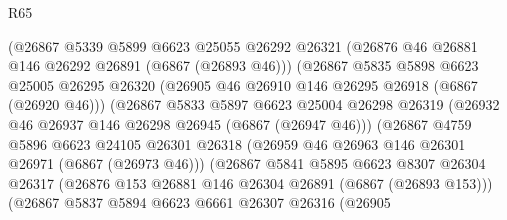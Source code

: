 \begin{lexlean}{R65}
\begin{coremodule}
{                              (@26867
                                @5339
                                @5899
                                @6623
                                @25055
                                @26292
                                @26321
                                (@26876 @46 @26881 @146 @26292 @26891 (@6867 (@26893 @46)))
                                (@26867
                                  @5835
                                  @5898
                                  @6623
                                  @25005
                                  @26295
                                  @26320
                                  (@26905 @46 @26910 @146 @26295 @26918 (@6867 (@26920 @46)))
                                  (@26867
                                    @5833
                                    @5897
                                    @6623
                                    @25004
                                    @26298
                                    @26319
                                    (@26932 @46 @26937 @146 @26298 @26945 (@6867 (@26947 @46)))
                                    (@26867
                                      @4759
                                      @5896
                                      @6623
                                      @24105
                                      @26301
                                      @26318
                                      (@26959 @46 @26963 @146 @26301 @26971 (@6867 (@26973 @46)))
                                      (@26867
                                        @5841
                                        @5895
                                        @6623
                                        @8307
                                        @26304
                                        @26317
                                        (@26876
                                          @153
                                          @26881
                                          @146
                                          @26304
                                          @26891
                                          (@6867 (@26893 @153)))
                                        (@26867
                                          @5837
                                          @5894
                                          @6623
                                          @6661
                                          @26307
                                          @26316
                                          (@26905
}
\end{coremodule}
\end{lexlean}

